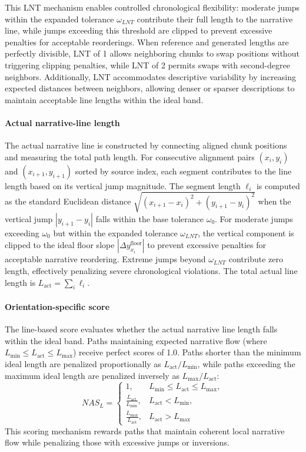 \documentclass[main.tex]{subfiles}
\begin{document}
This LNT mechanism enables controlled chronological flexibility: moderate jumps within the expanded tolerance $\omega_{LNT}$ contribute their full length to the narrative line, while jumps exceeding this threshold are clipped to prevent excessive penalties for acceptable reorderings. When reference and generated lengths are perfectly divisible, LNT of 1 allows neighboring chunks to swap positions without triggering clipping penalties, while LNT of 2 permits swaps with second-degree neighbors. Additionally, LNT accommodates descriptive variability by increasing expected distances between neighbors, allowing denser or sparser descriptions to maintain acceptable line lengths within the ideal band.

\paragraph{Actual narrative-line length}
The actual narrative line is constructed by connecting aligned chunk positions and measuring the total path length. For consecutive alignment pairs $(x_i, y_i)$ and $(x_{i+1}, y_{i+1})$ sorted by source index, each segment contributes to the line length based on its vertical jump magnitude. The segment length $\ell_i$ is computed as the standard Euclidean distance $\sqrt{(x_{i+1} - x_i)^2 + (y_{i+1} - y_i)^2}$ when the vertical jump $|y_{i+1} - y_i|$ falls within the base tolerance $\omega_0$. For moderate jumps exceeding $\omega_0$ but within the expanded tolerance $\omega_{LNT}$, the vertical component is clipped to the ideal floor slope $|\Delta y_{x_i}^{\text{floor}}|$ to prevent excessive penalties for acceptable narrative reordering. Extreme jumps beyond $\omega_{LNT}$ contribute zero length, effectively penalizing severe chronological violations. The total actual line length is $L_{\text{act}} = \sum_i \ell_i$.

\paragraph{Orientation-specific score}
The line-based score evaluates whether the actual narrative line length falls within the ideal band. Paths maintaining expected narrative flow (where $L_{\min} \leq L_{\text{act}} \leq L_{\max}$) receive perfect scores of 1.0. Paths shorter than the minimum ideal length are penalized proportionally as $L_{\text{act}}/L_{\min}$, while paths exceeding the maximum ideal length are penalized inversely as $L_{\max}/L_{\text{act}}$:
\begin{equation}
NAS_L = \begin{cases}
1, & L_{\min} \leq L_{\text{act}} \leq L_{\max}, \\
\frac{L_{\text{act}}}{L_{\min}}, & L_{\text{act}} < L_{\min}, \\
\frac{L_{\max}}{L_{\text{act}}}, & L_{\text{act}} > L_{\max}
\end{cases}
\end{equation}
This scoring mechanism rewards paths that maintain coherent local narrative flow while penalizing those with excessive jumps or inversions.
\end{document}
